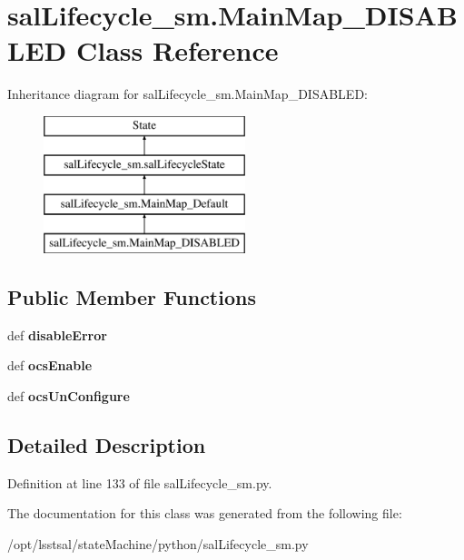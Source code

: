\hypertarget{classsal_lifecycle__sm_1_1_main_map___d_i_s_a_b_l_e_d}{\section{sal\-Lifecycle\-\_\-sm.\-Main\-Map\-\_\-\-D\-I\-S\-A\-B\-L\-E\-D Class Reference}
\label{classsal_lifecycle__sm_1_1_main_map___d_i_s_a_b_l_e_d}
}
Inheritance diagram for sal\-Lifecycle\-\_\-sm.\-Main\-Map\-\_\-\-D\-I\-S\-A\-B\-L\-E\-D\-:\begin{figure}[H]
\begin{center}
\leavevmode
\includegraphics[height=4.000000cm]{classsal_lifecycle__sm_1_1_main_map___d_i_s_a_b_l_e_d}
\end{center}
\end{figure}
\subsection*{Public Member Functions}
\begin{DoxyCompactItemize}
\item 
\hypertarget{classsal_lifecycle__sm_1_1_main_map___d_i_s_a_b_l_e_d_ad0e8ccfa8b3903201e6fb7d44a75a0a5}{def {\bfseries disable\-Error}}\label{classsal_lifecycle__sm_1_1_main_map___d_i_s_a_b_l_e_d_ad0e8ccfa8b3903201e6fb7d44a75a0a5}

\item 
\hypertarget{classsal_lifecycle__sm_1_1_main_map___d_i_s_a_b_l_e_d_a409afd12f8ff1f41557006b2f075f169}{def {\bfseries ocs\-Enable}}\label{classsal_lifecycle__sm_1_1_main_map___d_i_s_a_b_l_e_d_a409afd12f8ff1f41557006b2f075f169}

\item 
\hypertarget{classsal_lifecycle__sm_1_1_main_map___d_i_s_a_b_l_e_d_aecdf17bcbb1d82ae934ffab92f8c62f0}{def {\bfseries ocs\-Un\-Configure}}\label{classsal_lifecycle__sm_1_1_main_map___d_i_s_a_b_l_e_d_aecdf17bcbb1d82ae934ffab92f8c62f0}

\end{DoxyCompactItemize}


\subsection{Detailed Description}


Definition at line 133 of file sal\-Lifecycle\-\_\-sm.\-py.



The documentation for this class was generated from the following file\-:\begin{DoxyCompactItemize}
\item 
/opt/lsstsal/state\-Machine/python/sal\-Lifecycle\-\_\-sm.\-py\end{DoxyCompactItemize}
